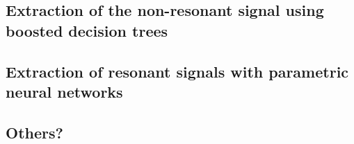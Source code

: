\subsection{Extraction of the non-resonant signal using boosted decision trees}



\subsection{Extraction of resonant signals with parametric neural networks}




\subsection{Others?}



